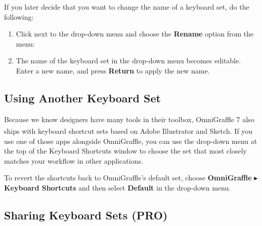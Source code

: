 \documentclass[../main.tex]{subfiles}
\begin{document}

If you later decide that you want to change the name of a keyboard set, do the following:

\begin{enumerate}
  \item Click  next to the drop-down menu and
    choose the \textbf{Rename} option from the menu:

  \item The name of the keyboard set in the drop-down menu becomes editable. Enter a new name,
    and press \textbf{Return} to apply the new name.

\end{enumerate}

\subsection{Using Another Keyboard Set}

Because we know designers have many tools in their toolbox, OmniGraffle 7 also ships with
keyboard shortcut sets based on Adobe Illustrator\textsuperscript{\textregistered{}} and
Sketch. If you use one of those apps alongside OmniGraffle, you can use the drop-down menu at
the top of the Keyboard Shortcuts window to choose the set that most closely matches your
workflow in other applications.


To revert the shortcuts back to OmniGraffle's default set, choose \textbf{OmniGraffle}
$\blacktriangleright$ \textbf{Keyboard Shortcuts} and then select \textbf{Default} in the
drop-down menu.

\subsection{Sharing Keyboard Sets (\texorpdfstring{\textbf{PRO}}{PRO})}
\end{document}
